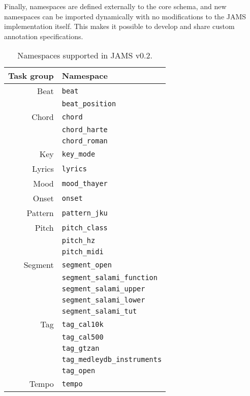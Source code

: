 \documentclass{article}
\begin{document}
Finally, namespaces are defined externally to the core schema, and new namespaces can be imported dynamically with no modifications to the JAMS implementation itself.
This makes it possible to develop and share custom annotation specifications.

\begin{table}
    \caption{Namespaces supported in JAMS v0.2.}\label{tab:namespaces}
    \centering
    \begin{tabular}{rl}
    \toprule
    Task group                  & Namespace\\
    \midrule
    Beat       & \texttt{beat}\\
                                & \texttt{beat\_position}\\

    Chord      & \texttt{chord}\\
                                & \texttt{chord\_harte}\\
                                & \texttt{chord\_roman}\\
    Key                         & \texttt{key\_mode }\\
    Lyrics                      & \texttt{lyrics}\\
    Mood                        & \texttt{mood\_thayer}\\
    Onset                       & \texttt{onset}\\
    Pattern                     & \texttt{pattern\_jku}\\
    Pitch      & \texttt{pitch\_class}\\
                                & \texttt{pitch\_hz}\\
                                & \texttt{pitch\_midi}\\
    Segment    & \texttt{segment\_open}\\
                                & \texttt{segment\_salami\_function}\\
                                & \texttt{segment\_salami\_upper}\\
                                & \texttt{segment\_salami\_lower}\\
                                & \texttt{segment\_salami\_tut}\\
    Tag        & \texttt{tag\_cal10k}\\
                                & \texttt{tag\_cal500}\\
                                & \texttt{tag\_gtzan}\\
                                & \texttt{tag\_medleydb\_instruments}\\
                                & \texttt{tag\_open}\\
    Tempo                       & \texttt{tempo}\\
    \bottomrule
    \end{tabular}
\end{table}
\end{document}

